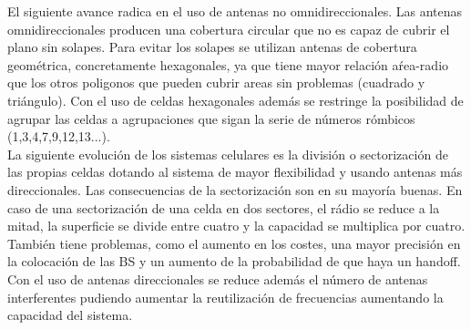 El siguiente avance radica en el uso de antenas no omnidireccionales. Las antenas omnidireccionales producen una cobertura circular que no es capaz de cubrir el plano sin solapes. Para evitar los solapes se utilizan antenas de cobertura geométrica, concretamente hexagonales, ya que tiene mayor relación aŕea-radio que los otros poligonos que pueden cubrir areas sin problemas (cuadrado y triángulo). Con el uso de celdas hexagonales además se restringe la posibilidad de agrupar las celdas a agrupaciones que sigan la serie de números rómbicos (1,3,4,7,9,12,13...).\\
La siguiente evolución de los sistemas celulares es la división o sectorización de las propias celdas dotando al sistema de mayor flexibilidad y usando antenas más direccionales. Las consecuencias de la sectorización son en su mayoría buenas. En caso de una sectorización de una celda en dos sectores, el rádio se reduce a la mitad, la superficie se divide entre cuatro y la capacidad se multiplica por cuatro. También tiene problemas, como el aumento en los costes, una mayor precisión en la colocación de las \acrshort{BS} y un aumento de la probabilidad de que haya un handoff. Con el uso de antenas direccionales se reduce además el número de antenas interferentes pudiendo aumentar la reutilización de frecuencias aumentando la capacidad del sistema.
